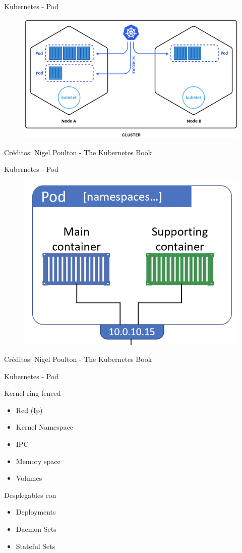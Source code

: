 \documentclass[aspectratio=169]{beamer}
\begin{document}
\begin{frame}{Kubernetes - Pod}
    \begin{figure}
        \centering
        \includegraphics[width=0.7\linewidth]{Images/kubernetespods.png}
    \end{figure}
Créditos: Nigel Poulton - The Kubernetes Book
\end{frame}


\begin{frame}{Kubernetes - Pod}
    \begin{figure}
        \centering
        \includegraphics[width=0.55\linewidth]{Images/podanatomy.png}
    \end{figure}
Créditos: Nigel Poulton - The Kubernetes Book
\end{frame}

\begin{frame}{Kubernetes - Pod}

Kernel ring fenced

                \begin{itemize}
                    \item Red (Ip)
                    \item Kernel Namespace
                    \item IPC
                    \item Memory space
                    \item Volumes
                \end{itemize}

Desplegables con
\begin{itemize}
    \item Deployments
    \item Daemon Sets
    \item Stateful Sets
\end{itemize}

\end{frame}
\end{document}
